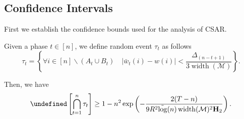 \documentclass{article}
\newcommand{\AlgorithmBud}{{\small \textsf{CSAR}}\xspace}
\newcommand{\M}{\mathcal M}
\newcommand{\del}{\backslash}
\DeclareMathOperator{\rank}{width}
\newcommand{\barlog}{\tilde{\log}}
\let\Pr\undefined
\DeclareMathOperator{\Pr}{Pr}
\begin{document}
\subsection{Confidence Intervals}


First we establish the confidence bounds used for the analysis of \AlgorithmBud. 
\begin{lemma}
\label{lemma:fbudget:ci}

Given a phase $t\in[n]$, we define random event $\tau_t$ as follows
\begin{equation}
\label{eq:define-tau}
\tau_t = \left\{\forall i\in[n] \del (A_t\cup B_t) \quad \big|\bar w_t(i)-w(i)\big| < \frac{\Delta_{(n-t+1)}}{3\rank(\M)} \right\}.
\end{equation}

Then, we have
\begin{equation}
\label{eq:fbudget-prob-error-1}
\Pr\left[\bigcap_{t=1}^n \tau_t \right] \ge 1- n^2  \exp\left(-\frac{2(T-n)}{9R^2 \barlog(n) \rank(\M)^2 \mathbf H_2} \right).
\end{equation}
\end{lemma}
\end{document}

